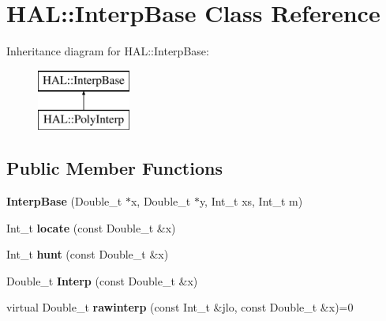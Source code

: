 \hypertarget{class_h_a_l_1_1_interp_base}{\section{H\-A\-L\-:\-:Interp\-Base Class Reference}
\label{class_h_a_l_1_1_interp_base}
}
Inheritance diagram for H\-A\-L\-:\-:Interp\-Base\-:\begin{figure}[H]
\begin{center}
\leavevmode
\includegraphics[height=2.000000cm]{class_h_a_l_1_1_interp_base}
\end{center}
\end{figure}
\subsection*{Public Member Functions}
\begin{DoxyCompactItemize}
\item 
\hypertarget{class_h_a_l_1_1_interp_base_a7da5f00617f93f337e983e48faa339d7}{{\bfseries Interp\-Base} (Double\-\_\-t $\ast$x, Double\-\_\-t $\ast$y, Int\-\_\-t xs, Int\-\_\-t m)}\label{class_h_a_l_1_1_interp_base_a7da5f00617f93f337e983e48faa339d7}

\item 
\hypertarget{class_h_a_l_1_1_interp_base_a54d32cf70679d2eb8d1a39a0bd242b39}{Int\-\_\-t {\bfseries locate} (const Double\-\_\-t \&x)}\label{class_h_a_l_1_1_interp_base_a54d32cf70679d2eb8d1a39a0bd242b39}

\item 
\hypertarget{class_h_a_l_1_1_interp_base_ad1bccffef0b532774150b419dbdff5b3}{Int\-\_\-t {\bfseries hunt} (const Double\-\_\-t \&x)}\label{class_h_a_l_1_1_interp_base_ad1bccffef0b532774150b419dbdff5b3}

\item 
\hypertarget{class_h_a_l_1_1_interp_base_a7d86cc16a9c8ba0bf24e8137f9eb21b3}{Double\-\_\-t {\bfseries Interp} (const Double\-\_\-t \&x)}\label{class_h_a_l_1_1_interp_base_a7d86cc16a9c8ba0bf24e8137f9eb21b3}

\item 
\hypertarget{class_h_a_l_1_1_interp_base_a524cc9b36f0e36c8f69f5c77bc68de7b}{virtual Double\-\_\-t {\bfseries rawinterp} (const Int\-\_\-t \&jlo, const Double\-\_\-t \&x)=0}\label{class_h_a_l_1_1_interp_base_a524cc9b36f0e36c8f69f5c77bc68de7b}

\end{DoxyCompactItemize}
